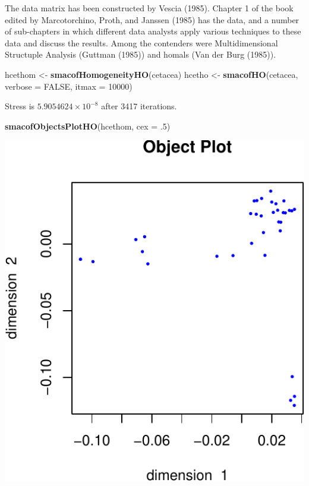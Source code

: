 \documentclass[
  12pt,
]{article}
\newenvironment{Shaded}{\begin{snugshade}}{\end{snugshade}}
\newcommand{\AttributeTok}[1]{\textcolor[rgb]{0.13,0.29,0.53}{#1}}
\newcommand{\ConstantTok}[1]{\textcolor[rgb]{0.56,0.35,0.01}{#1}}
\newcommand{\DecValTok}[1]{\textcolor[rgb]{0.00,0.00,0.81}{#1}}
\newcommand{\FunctionTok}[1]{\textcolor[rgb]{0.13,0.29,0.53}{\textbf{#1}}}
\newcommand{\NormalTok}[1]{#1}
\newcommand{\OtherTok}[1]{\textcolor[rgb]{0.56,0.35,0.01}{#1}}
\begin{document}
The data matrix has been constructed by Vescia (1985). Chapter 1 of the
book edited by Marcotorchino, Proth, and Janssen (1985) has the data, and a number of sub-chapters in which different data analysts
apply various techniques to these data and discuss the results. Among the contenders were Multidimensional Structuple Analysis (Guttman (1985))
and homals (Van der Burg (1985)).

\begin{Shaded}
\begin{Highlighting}[]
\NormalTok{hcethom }\OtherTok{\textless{}{-}} \FunctionTok{smacofHomogeneityHO}\NormalTok{(cetacea)}
\NormalTok{hcetho }\OtherTok{\textless{}{-}} \FunctionTok{smacofHO}\NormalTok{(cetacea, }\AttributeTok{verbose =} \ConstantTok{FALSE}\NormalTok{, }\AttributeTok{itmax =} \DecValTok{10000}\NormalTok{)}
\end{Highlighting}
\end{Shaded}

Stress is \ensuremath{5.9054624\times 10^{-8}} after 3417 iterations.

\begin{Shaded}
\begin{Highlighting}[]
\FunctionTok{smacofObjectsPlotHO}\NormalTok{(hcethom, }\AttributeTok{cex =}\NormalTok{ .}\DecValTok{5}\NormalTok{)}
\end{Highlighting}
\end{Shaded}

\includegraphics{smacofHO_files/figure-latex/unnamed-chunk-1-1.pdf}
\end{document}
